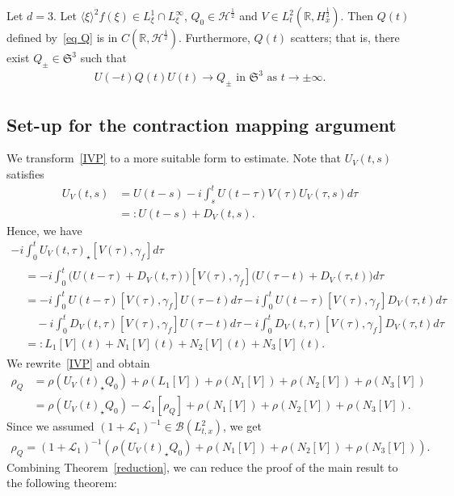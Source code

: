 \documentclass[AHL,Unicode,longabstracts,MathTools,published]{cedram}
\newcommand{\BR}{\mathbb{R}}
\newcommand{\CB}{\mathcal{B}}
\newcommand{\CH}{\mathcal{H}}
\newcommand{\CL}{\mathcal{L}}
\newcommand{\FS}{\mathfrak{S}}
\newcommand{\ga}{\gamma}
\newcommand{\ta}{\tau}
\newcommand{\rh}{\rho}
\newcommand{\Br}[1]{\langle #1 \rangle}
\newcommand{\I}{\infty}
\newcommand{\st}{\star}
\newcommand{\R}{\mathbb{R}}
\newcommand{\tw}{\frac{1}{2}}
\begin{document}
\begin{lemm} \label{reduction}
Let $d=3$. Let $\Br{\xi}^2 f(\xi) \in L^1_\xi \cap L^\I_\xi$, $Q_0 \in \CH^\tw$ and $V \in L^2_t(\R,H^\tw_x)$. Then $Q(t)$ defined by~\eqref{eq Q} is in $C(\BR, \CH^\tw)$. Furthermore, $Q(t)$ scatters; that is, there exist $Q_\pm \in \FS^3$ such that
\begin{align}
U(-t)Q(t)U(t) \to Q_\pm \text{ in } \FS^3 \text{ as } t \to \pm \I.
\end{align}
\end{lemm}


\subsection{Set-up for the contraction mapping argument}

We transform~\eqref{IVP} to a more suitable form to estimate. Note that $U_V(t,s)$ satisfies
\begin{equation}
\begin{split}
U_V(t,s) &= U(t-s) -i \int_s^t U(t-\ta) V(\ta) U_V(\ta,s) d\ta \\
&=:U(t-s) + D_V(t,s).
\end{split}
\end{equation}
Hence, we have
\begin{multline}\label{ABCD}
-i\int_0^t U_V(t,\ta)_\st [V(\ta),\ga_f] d\ta \\
\begin{aligned}
&= -i \int_0^t \big(U(t-\ta)+D_V(t,\ta)\big)[V(\ta), \ga_f] \big(U(\ta-t)+D_V(\ta,t)\big)d\ta \\
&= -i \int_0^t U(t-\ta)[V(\ta), \ga_f] U(\ta-t)d\ta -i \int_0^t U(t-\ta)[V(\ta), \ga_f] D_V(\ta,t)d\ta \\
&\quad -i \int_0^t D_V(t,\ta)[V(\ta), \ga_f] U(\ta-t)d\ta -i \int_0^t D_V(t,\ta)[V(\ta), \ga_f] D_V(\ta,t)d\ta \\
& =: L_1[V](t) + N_1[V](t) + N_2[V](t) + N_3[V](t). 
\end{aligned}
\end{multline}
We rewrite~\eqref{IVP} and obtain
\begin{equation}
\begin{split}
\rh_Q &= \rh(U_V(t)_\st Q_0) + \rh(L_1[V])+ \rh(N_1[V])+ \rh(N_2[V])+ \rh(N_3[V]) \\
&= \rh(U_V(t)_\st Q_0) -\CL_1[\rh_Q] + \rh(N_1[V])+ \rh(N_2[V])+ \rh(N_3[V]).
\end{split}
\end{equation}
Since we assumed $(1+\CL_1)^{-1}\in \CB(L^2_{t,x})$, we get
\begin{align}\label{IVP*}
\tag{IVP*}
\rh_Q = (1+\CL_1)^{-1}(\rh(U_V(t)_\st Q_0) +\rh(N_1[V])+ \rh(N_2[V])+ \rh(N_3[V])).
\end{align}
Combining Theorem~\ref{reduction}, we can reduce the proof of the main result to the following theorem:
\end{document}
